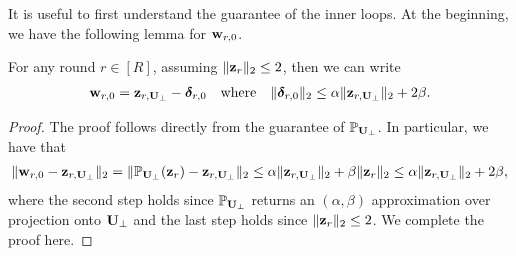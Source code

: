 It is useful to first understand the guarantee of the inner loops. 
At the beginning, we have the following lemma for $\mathbf{w}_{r, 0}$.
\begin{lemma}
\label{lem:inner-begin}
For any round $r \in [R]$, assuming $\|\mathbf{z}_r\|_2\leq 2$, then we can write 
\begin{align*}
\mathbf{w}_{r, 0} = \mathbf{z}_{r, \mathbf{U}_\perp} - \boldsymbol\delta_{r, 0} \quad \text{where} \quad \|\boldsymbol\delta_{r, 0}\|_{2} \leq \alpha \|\mathbf{z}_{r, \mathbf{U}_{\perp}}\|_2 + 2\beta.
\end{align*}
\end{lemma}
\begin{proof}
The proof follows directly from the guarantee of $\mathbb{P}_{\mathbf{U}_\perp}$. In particular, we have that 
\begin{align*}
\|\mathbf{w}_{r, 0} - \mathbf{z}_{r, \mathbf{U}_{\perp}}\|_2 = \|\mathbb{P}_{\mathbf{U}_\perp}(\mathbf{z}_r) - \mathbf{z}_{r, \mathbf{U}_{\perp}}\|_2 \leq \alpha \|\mathbf{z}_{r, \mathbf{U}_{\perp}}\|_2 + \beta \|\mathbf{z}_r\|_2 \leq \alpha \|\mathbf{z}_{r, \mathbf{U}_{\perp}}\|_2 + 2\beta,
\end{align*}
where the second step holds since $\mathbb{P}_{\mathbf{U}_\perp}$ returns an $(\alpha, \beta)$ approximation over projection onto $\mathbf{U}_{\perp}$ and the last step holds since $\|\mathbf{z}_r\|_2 \leq 2$. 
We complete the proof here.
\end{proof}

